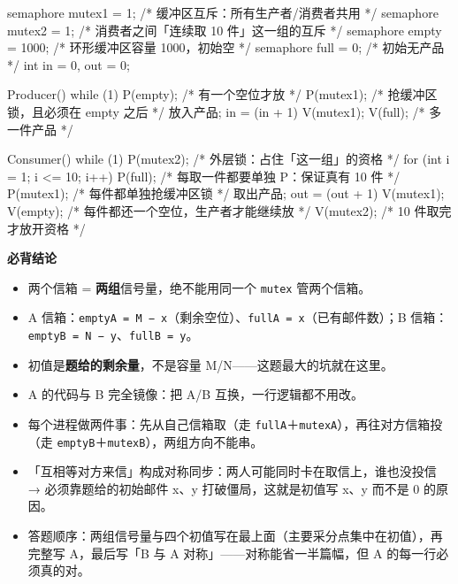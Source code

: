 \documentclass[10pt,a4paper]{ctexart}
\begin{document}
\begin{codebox}
semaphore mutex1 = 1;        /* 缓冲区互斥：所有生产者/消费者共用 */
semaphore mutex2 = 1;        /* 消费者之间「连续取 10 件」这一组的互斥 */
semaphore empty  = 1000;     /* 环形缓冲区容量 1000，初始空 */
semaphore full   = 0;        /* 初始无产品 */
int in = 0, out = 0;

Producer() { while (1) {
    P(empty);                /* 有一个空位才放 */
    P(mutex1);               /* 抢缓冲区锁，且必须在 empty 之后 */
    放入产品; in = (in + 1) %
    V(mutex1);
    V(full);                 /* 多一件产品 */
} }

Consumer() { while (1) {
    P(mutex2);                        /* 外层锁：占住「这一组」的资格 */
    for (int i = 1; i <= 10; i++) {
        P(full);                      /* 每取一件都要单独 P：保证真有 10 件 */
        P(mutex1);                    /* 每件都单独抢缓冲区锁 */
        取出产品; out = (out + 1) %
        V(mutex1);
        V(empty);                     /* 每件都还一个空位，生产者才能继续放 */
    }
    V(mutex2);                        /* 10 件取完才放开资格 */
} }
\end{codebox}




\textbf{必背结论}

\begin{itemize}

\item 两个信箱 = \textbf{两组}信号量，绝不能用同一个 \texttt{mutex} 管两个信箱。

\item A 信箱：\texttt{emptyA = M − x}（剩余空位）、\texttt{fullA = x}（已有邮件数）；B 信箱：\texttt{emptyB = N − y}、\texttt{fullB = y}。

\item 初值是\textbf{题给的剩余量}，不是容量 M/N——这题最大的坑就在这里。

\item A 的代码与 B 完全镜像：把 A/B 互换，一行逻辑都不用改。

\item 每个进程做两件事：先从自己信箱取（走 \texttt{fullA}＋\texttt{mutexA}），再往对方信箱投（走 \texttt{emptyB}＋\texttt{mutexB}），两组方向不能串。

\item 「互相等对方来信」构成对称同步：两人可能同时卡在取信上，谁也没投信 → 必须靠题给的初始邮件 x、y 打破僵局，这就是初值写 x、y 而不是 0 的原因。

\item 答题顺序：两组信号量与四个初值写在最上面（主要采分点集中在初值），再完整写 A，最后写「B 与 A 对称」——对称能省一半篇幅，但 A 的每一行必须真的对。

\end{itemize}
\end{document}
